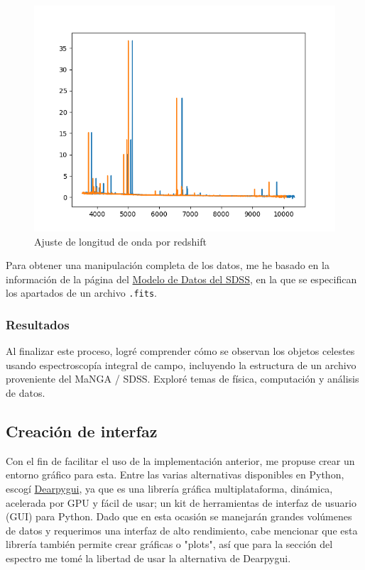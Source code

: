 \documentclass[10pt,twocolumn,a4paper]{opticajnl}
\begin{document}
\begin{figure}
    \centering
    \includegraphics[width=1\linewidth]{redshift_ajuste.png}
    \caption{Ajuste de longitud de onda por redshift}
    \label{fig:redshift_ajuste}
\end{figure}

Para obtener una manipulación completa de los datos, me he basado en la información de la página del \href{https://data.sdss.org/datamodel/files/MANGA_SPECTRO_DATA/MJD5/sdR.html}{Modelo de Datos del SDSS}, en la que se especifican los apartados de un archivo \verb|.fits|.

\subsubsection*{Resultados}
Al finalizar este proceso, logré comprender cómo se observan los objetos celestes usando espectroscopía integral de campo, incluyendo la estructura de un archivo proveniente del MaNGA / SDSS. Exploré temas de física, computación y análisis de datos.

\subsection*{Creación de interfaz}
Con el fin de facilitar el uso de la implementación anterior, me propuse crear un entorno gráfico para esta. Entre las varias alternativas disponibles en Python, escogí \href{https://dearpygui.readthedocs.io/en/latest/}{Dearpygui}, ya que es una librería gráfica multiplataforma, dinámica, acelerada por GPU y fácil de usar; un kit de herramientas de interfaz de usuario (GUI) para Python. Dado que en esta ocasión se manejarán grandes volúmenes de datos y requerimos una interfaz de alto rendimiento, cabe mencionar que esta librería también permite crear gráficas o "plots", así que para la sección del espectro me tomé la libertad de usar la alternativa de Dearpygui.
\end{document}
